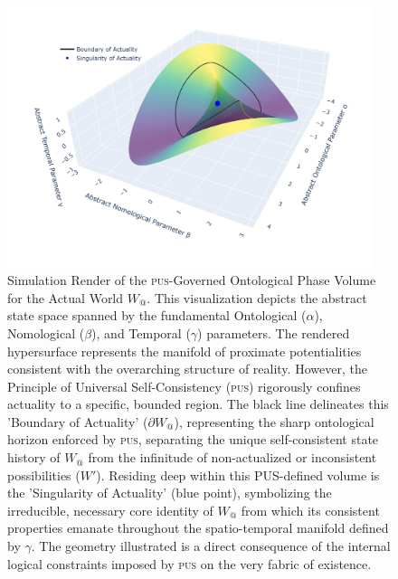 \documentclass[11pt, a4paper]{article}
\makeatletter
\newcommand{\pus}{\textsc{pus}} %
\newcommand{\Wactual}{W_{@}} %
\makeatother
\begin{document}
\begin{figure}[htbp]
    \centering
    \includegraphics[width=0.95\textwidth]{figures/pus-illustration.png} %
    \caption{Simulation Render of the \pus{}-Governed Ontological Phase Volume for the Actual World $\Wactual$. This visualization depicts the abstract state space spanned by the fundamental Ontological ($\alpha$), Nomological ($\beta$), and Temporal ($\gamma$) parameters. The rendered hypersurface represents the manifold of proximate potentialities consistent with the overarching structure of reality. However, the Principle of Universal Self-Consistency (\pus) rigorously confines actuality to a specific, bounded region. The black line delineates this 'Boundary of Actuality' ($\partial \Wactual$), representing the sharp ontological horizon enforced by \pus{}, separating the unique self-consistent state history of $\Wactual$ from the infinitude of non-actualized or inconsistent possibilities ($W'$). Residing deep within this PUS-defined volume is the 'Singularity of Actuality' (blue point), symbolizing the irreducible, necessary core identity of $\Wactual$ from which its consistent properties emanate throughout the spatio-temporal manifold defined by $\gamma$. The geometry illustrated is a direct consequence of the internal logical constraints imposed by \pus{} on the very fabric of existence.}
    \label{fig:phase3d_actual_hyper} %
\end{figure}
\FloatBarrier 
\end{document}
